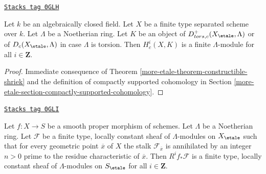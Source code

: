 \begin{lemma}
\label{more-etale-lemma-finiteness-compactly-supported}
\href{https://stacks.math.columbia.edu/tag/0GLH}{\texttt{Stacks tag 0GLH}}

Let $k$ be an algebraically closed field.
Let $X$ be a finite type separated scheme over $k$.
Let $\Lambda$ be a Noetherian ring. Let $K$ be an object of
$D^+_{tors, c}(X_\etale, \Lambda)$ or of $D_c(X_\etale, \Lambda)$
in case $\Lambda$ is torsion. Then
$H^i_c(X, K)$ is a finite $\Lambda$-module for all
$i \in \mathbf{Z}$.
\end{lemma}

\begin{proof}
Immediate consequence of Theorem \ref{more-etale-theorem-constructible-shriek}
and the definition of compactly supported cohomology in
Section \ref{more-etale-section-compactly-supported-cohomology}.
\end{proof}

\begin{proposition}
\label{more-etale-proposition-loc-cst-torsion}
\href{https://stacks.math.columbia.edu/tag/0GLI}{\texttt{Stacks tag 0GLI}}

Let $f : X \to S$ be a smooth proper morphism of schemes.
Let $\Lambda$ be a Noetherian ring. Let $\mathcal{F}$ be a
finite type, locally constant sheaf of $\Lambda$-modules
on $X_\etale$ such that for every geometric point $\overline{x}$ of $X$
the stalk $\mathcal{F}_{\overline{x}}$ is annihilated by an integer
$n > 0$ prime to the residue characteristic of $\overline{x}$.
Then $R^if_*\mathcal{F}$ is a finite type, locally constant sheaf of
$\Lambda$-modules on $S_\etale$ for all $i \in \mathbf{Z}$.
\end{proposition}

